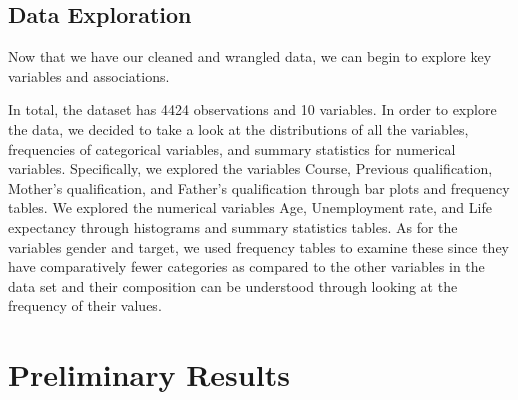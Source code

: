 \documentclass[
]{article}
\begin{document}
\hypertarget{data-exploration}{%
\subsection{Data Exploration}\label{data-exploration}}

Now that we have our cleaned and wrangled data, we can begin to explore
key variables and associations.

In total, the dataset has 4424 observations and 10 variables. In order
to explore the data, we decided to take a look at the distributions of
all the variables, frequencies of categorical variables, and summary
statistics for numerical variables. Specifically, we explored the
variables Course, Previous qualification, Mother's qualification, and
Father's qualification through bar plots and frequency tables. We
explored the numerical variables Age, Unemployment rate, and Life
expectancy through histograms and summary statistics tables. As for the
variables gender and target, we used frequency tables to examine these
since they have comparatively fewer categories as compared to the other
variables in the data set and their composition can be understood
through looking at the frequency of their values.

\hypertarget{preliminary-results}{%
\section{Preliminary Results}\label{preliminary-results}}
\end{document}
